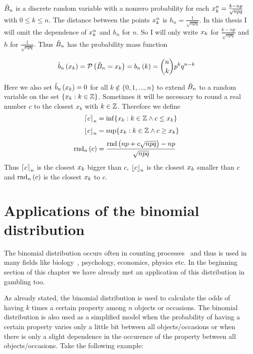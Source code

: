 $\BBs$ is a discrete random variable with a nonzero probability for each $\x[k]^n = \frac{k-np}{\sqrt{npq}}$ with $0\le k\le n$. The distance between the points $\x[k]^n$  is $h_n = \frac{1}{\sqrt{npq}}$. In this thesis I will omit the dependence of $\x^n$ and $h_n$ for $n$. So I will only write $\x$ for $\frac{k-np}{\sqrt{npq}}$ and $h$ for $\frac 1{\sqrt{npq}}$. Thus $\BBs$ has the probability mass function

\begin{align}
  \bb{\x[k]} = \P{\BBs = \x[k]} = \b{k} = \binom nk p^kq^{n-k}
\end{align}

Here we also set $\bb{\x[k]}=0$ for all $k\notin\{0,1,\ldots,n\}$ to extend $\BBs$ to a random variable on the set $\{\x[k] : k\in\Z\}$. Sometimes it will be necessary to round a real number $c$ to the closest $x_k$ with $k\in\Z$. Therefore we define
\begin{align}
  \xup{c} &= \inf \{ x_k : k\in\Z \land c \le x_k \} \nl
  \xdown{c} &= \sup \{ x_k : k \in \Z \land c \ge x_k \} \nl
  \xrnd{c} &= \frac{\rnd{np+c\sqrt{npq}}-np}{\sqrt{npq}}
\end{align}
Thus $\xup{c}$ is the closest $\x$ bigger than $c$, $\xdown{c}$ is the closest $\x$ smaller than $c$ and $\xrnd{c}$ is the closest $\x$ to $c$.

\section{Applications of the binomial distribution}

The binomial distribution occurs often in counting processes~\cite[p. 138]{henze} and thus is used in many fields like biology~\cite[p. 146]{henze}, psychology, economics, physics etc.  In the beginning section of this chapter we have already met an application of this distribution in gambling too.


As already stated, the binomial distribution is used to calculate the odds of having $k$ times a certain property among $n$ objects or occasions. The binomial distribution is also used as a simplified model when the probability of having a certain property varies only a little bit between all objects/occasions or when there is only a slight dependence in the occurence of the property between all objects/occasions. Take the following example:

